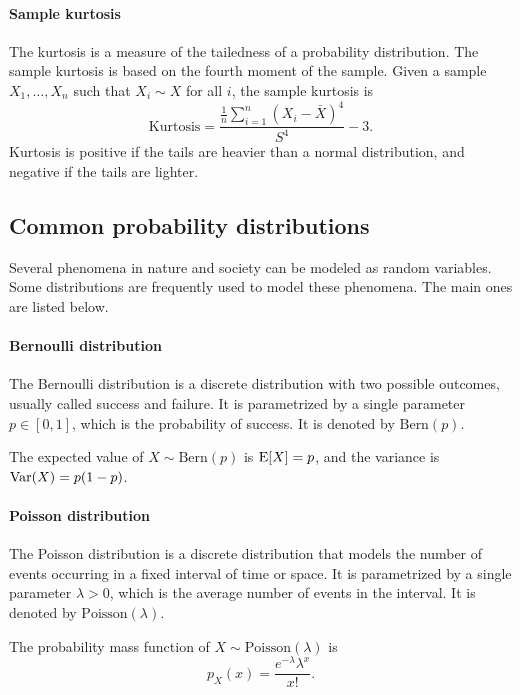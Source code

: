 \paragraph{Sample kurtosis}  The kurtosis is a measure of the tailedness of a probability
distribution.  The sample kurtosis is based on the fourth moment of the sample.  Given a
sample $X_1, \dots, X_n$ such that $X_i \sim X$ for all $i$, the sample kurtosis is
\begin{equation*}
  \text{Kurtosis} = \frac{\frac{1}{n} \sum_{i = 1}^n (X_i - \bar{X})^4}{S^4} - 3\text{.}
\end{equation*}
Kurtosis is positive if the tails are heavier than a normal distribution, and negative if
the tails are lighter.

\subsection{Common probability distributions}

Several phenomena in nature and society can be modeled as random variables.  Some
distributions are frequently used to model these phenomena.  The main ones are
listed below.

\paragraph{Bernoulli distribution}  The Bernoulli distribution is a discrete
distribution with two possible outcomes, usually called success and failure.  It is
parametrized by a single parameter $p \in [0, 1]$, which is the probability of
success.  It is denoted by $\text{Bern}(p)$.

The expected value of $X \sim \text{Bern}(p)$ is $\operatorname{E}[X] = p$, and the variance is
$\operatorname{Var}(X) = p(1 - p)$.

\paragraph{Poisson distribution}  The Poisson distribution is a discrete distribution
that models the number of events occurring in a fixed interval of time or space.  It is
parametrized by a single parameter $\lambda > 0$, which is the average number of events
in the interval.  It is denoted by $\text{Poisson}(\lambda)$.

The probability mass function of $X \sim \text{Poisson}(\lambda)$ is
\begin{equation}
  \label{eq:poisson}
  p_X(x) = \frac{e^{-\lambda} \lambda^x}{x!}\text{.}
\end{equation}

